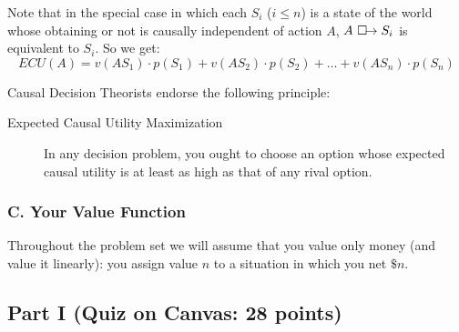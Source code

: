 \documentclass[12pt,letterpaper]{article}
\begin{document}
{Note that in the special case in which each $S_i$ ($i \leq n$) is a state of the world whose obtaining or not is causally independent of action $A$, $A \ \Box\hspace{-1.6mm}\rightarrow S_i$ is equivalent to $S_i$. So we get:
\[
ECU(A) = v(A S_1) \cdot p(S_1) +  v(A S_2) \cdot p(S_2) + \ldots +  v(A S_n) \cdot p(S_n)
\]


Causal Decision Theorists endorse the following principle:
\begin{description}
\item[Expected Causal Utility Maximization]
In any decision problem, you ought to choose an option whose expected causal utility is at least as high as that of any rival option.
\end{description}



\subsubsection*{C. Your Value Function} 


Throughout the problem set we will assume that you value only money (and value it linearly): you assign value \(n\) to a situation in which you net \(\$n\).
}

\subsection*{Part I (Quiz on Canvas: 28 points)} 
\end{document}
